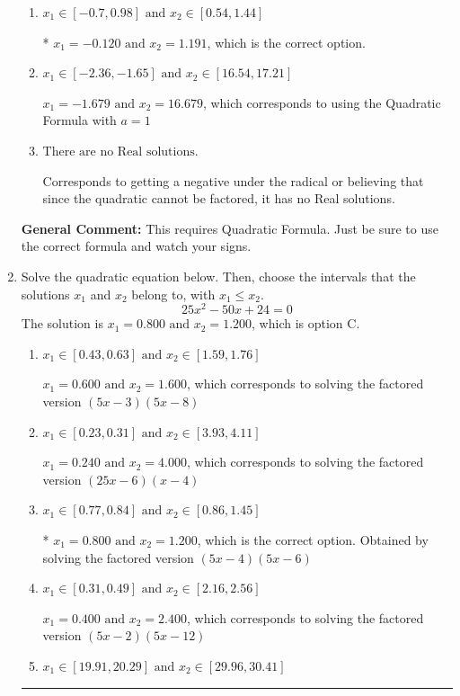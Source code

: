 \documentclass{extbook}[14pt]
\newcommand{\litem}[1]{\item #1

\rule{\textwidth}{0.4pt}}
\begin{document}
\begin{enumerate}
{\begin{enumerate}[label=\Alph*.]
 $x_1 = -1.191 \text{ and } x_2 = 0.120$, which corresponds to writing the Quadratic Formula as $\frac{b \pm \sqrt{b^2 - 4ac}}{2a}$
\item \( x_1 \in [-0.7, 0.98] \text{ and } x_2 \in [0.54, 1.44] \)

* $x_1 = -0.120 \text{ and } x_2 = 1.191$, which is the correct option.
\item \( x_1 \in [-2.36, -1.65] \text{ and } x_2 \in [16.54, 17.21] \)

 $x_1 = -1.679 \text{ and } x_2 = 16.679$, which corresponds to using the Quadratic Formula with $a=1$
\item \( \text{There are no Real solutions.} \)

Corresponds to getting a negative under the radical or believing that since the quadratic cannot be factored, it has no Real solutions.
\end{enumerate}

\textbf{General Comment:} This requires Quadratic Formula. Just be sure to use the correct formula and watch your signs.
}
\litem{
Solve the quadratic equation below. Then, choose the intervals that the solutions $x_1$ and $x_2$ belong to, with $x_1 \leq x_2$.
\[ 25x^{2} -50 x + 24 = 0 \]The solution is \( x_1 = 0.800 \text{ and } x_2 = 1.200 \), which is option C.\begin{enumerate}[label=\Alph*.]
\item \( x_1 \in [0.43, 0.63] \text{ and } x_2 \in [1.59, 1.76] \)

$x_1 = 0.600 \text{ and } x_2 = 1.600$, which corresponds to solving the factored version $(5x -3)(5x -8)$
\item \( x_1 \in [0.23, 0.31] \text{ and } x_2 \in [3.93, 4.11] \)

$x_1 = 0.240 \text{ and } x_2 = 4.000$, which corresponds to solving the factored version $(25x -6)(x -4)$
\item \( x_1 \in [0.77, 0.84] \text{ and } x_2 \in [0.86, 1.45] \)

* $x_1 = 0.800 \text{ and } x_2 = 1.200$, which is the correct option. Obtained by solving the factored version $(5x -4)(5x -6)$
\item \( x_1 \in [0.31, 0.49] \text{ and } x_2 \in [2.16, 2.56] \)

$x_1 = 0.400 \text{ and } x_2 = 2.400$, which corresponds to solving the factored version $(5x -2)(5x -12)$
\item \( x_1 \in [19.91, 20.29] \text{ and } x_2 \in [29.96, 30.41] \)


\end{enumerate}}
\end{enumerate}
\end{document}
